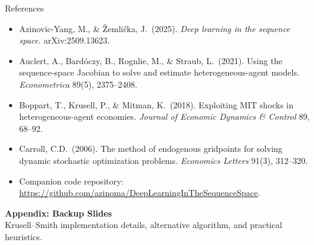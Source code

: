\documentclass[aspectratio=169,11pt]{beamer}
\begin{document}
\begin{frame}{References}
\small
\begin{itemize}\itemsep5pt
    \item Azinovic-Yang, M., \& \v{Z}emli\v{c}ka, J.\ (2025). \emph{Deep learning in the sequence space.} arXiv:2509.13623.
    \item Auclert, A., Bard\'oczy, B., Rognlie, M., \& Straub, L.\ (2021). Using the sequence-space Jacobian to solve and estimate heterogeneous-agent models. \emph{Econometrica} 89(5), 2375--2408.
    \item Boppart, T., Krusell, P., \& Mitman, K.\ (2018). Exploiting MIT shocks in heterogeneous-agent economies. \emph{Journal of Economic Dynamics \& Control} 89, 68--92.
    \item Carroll, C.D.\ (2006). The method of endogenous gridpoints for solving dynamic stochastic optimization problems. \emph{Economics Letters} 91(3), 312--320.
    \item Companion code repository: \scriptsize\url{https://github.com/azinoma/DeepLearningInTheSequenceSpace}.
\end{itemize}
\end{frame}


%

\appendix

\begin{frame}{}
\centering\vspace{2.0cm}
{\Huge\color{uzhblue}\textbf{Appendix: Backup Slides}}\\[6pt]
{\small Krusell--Smith implementation details, alternative algorithm, and practical heuristics.}
\end{frame}


\end{document}
